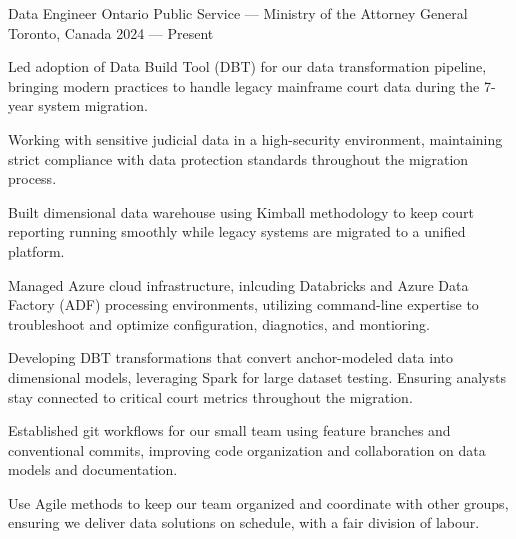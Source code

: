 
\begin{cventries}

\cventry%
 {Data Engineer}
 {Ontario Public Service --- Ministry of the Attorney General}
 {Toronto, Canada}
 {2024 --- Present}
 {
	\begin{cvitems}
		\item Led adoption of Data Build Tool (DBT) for our data transformation pipeline, bringing modern practices to handle legacy mainframe court data during the 7-year system migration.
		\item Working with sensitive judicial data in a high-security environment, maintaining strict compliance with data protection standards throughout the migration process.
		\item Built dimensional data warehouse using Kimball methodology to keep court reporting running smoothly while legacy systems are migrated to a unified platform.
		\item Managed Azure cloud infrastructure, inlcuding Databricks and Azure Data Factory (ADF) processing environments, utilizing command-line expertise to troubleshoot and optimize configuration, diagnotics, and montioring.
		\item Developing DBT transformations that convert anchor-modeled data into dimensional models, leveraging Spark for large dataset testing. Ensuring analysts stay connected to critical court metrics throughout the migration.
		\item Established git workflows for our small team using feature branches and conventional commits, improving code organization and collaboration on data models and documentation.
		\item Use Agile methods to keep our team organized and coordinate with other groups, ensuring we deliver data solutions on schedule, with a fair division of labour.
	\end{cvitems}
 }


\end{cventries}
